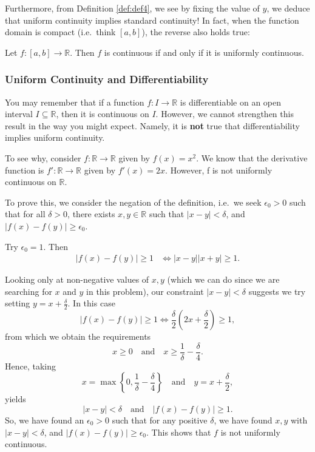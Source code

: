 \documentclass[
  10pt,
  a4paper]{article}
\theoremstyle{plain}
\theoremstyle{definition}
\theoremstyle{plain}
\theoremstyle{plain}
\theoremstyle{plain}
\theoremstyle{plain}
\theoremstyle{definition}
\theoremstyle{definition}
\theoremstyle{remark}
\theoremstyle{remark}
\let\BeginKnitrBlock\begin \let\EndKnitrBlock\end
\begin{document}
Furthermore, from Definition \ref{def:def4}, we see by fixing the value of \(y\), we deduce that uniform continuity implies standard continuity! In fact, when the function domain is compact (i.e.~think \([a,b]\)), the reverse also holds true:

\BeginKnitrBlock{proposition}
{\label{prp:prop2} }Let \(f:[a,b] \to \mathbb{R}\). Then \(f\) is continuous if and only if it is uniformly continuous.
\EndKnitrBlock{proposition}

\hypertarget{uniform-continuity-and-differentiability}{%
\subsubsection{Uniform Continuity and Differentiability}\label{uniform-continuity-and-differentiability}}

You may remember that if a function \(f:I \to \mathbb{R}\) is differentiable on an open interval \(I \subseteq \mathbb{R}\), then it is continuous on \(I\). However, we cannot strengthen this result in the way you might expect. Namely, it is \textbf{not} true that differentiability implies uniform continuity.

\BeginKnitrBlock{example}
{\label{exm:ex1} }To see why, consider \(f:\mathbb{R} \to \mathbb{R}\) given by \(f(x) = x^2\). We know that the derivative function is \(f':\mathbb{R} \to \mathbb{R}\) given by \(f'(x) = 2x.\) However, f is not uniformly continuous on \(\mathbb{R}\).

To prove this, we consider the negation of the definition, i.e.~we seek \(\epsilon_0 >0\) such that for all \(\delta > 0\), there exists \(x,y \in \mathbb{R}\) such that \(\lvert x - y \rvert < \delta\), and \(\lvert f(x) - f(y) \rvert \geq \epsilon_0.\)

Try \(\epsilon_0 = 1.\) Then
\begin{align*}
\lvert f(x) - f(y) \rvert \geq 1 &\Leftrightarrow \lvert x - y \rvert \lvert x + y \rvert \geq 1.
\end{align*}

Looking only at non-negative values of \(x,y\) (which we can do since we are searching for \(x\) and \(y\) in this problem), our constraint \(\lvert x - y \rvert < \delta\) suggests we try setting \(y = x + \frac{\delta}{2}.\) In this case \[\lvert f(x) - f(y) \rvert \geq 1 \Leftrightarrow \frac{\delta}{2}\left(2x + \frac{\delta}{2}\right) \geq 1,\] from which we obtain the requirements \[x \geq 0 \quad \text{and} \quad x \geq \frac{1}{\delta} - \frac{\delta}{4}.\] Hence, taking \[x = \max\left\lbrace 0 , \frac{1}{\delta} - \frac{\delta}{4}\right\rbrace \quad \text{and} \quad y = x + \frac{\delta}{2},\] yields \[\lvert x - y \rvert < \delta \quad \text{and} \quad \lvert f(x) - f(y) \rvert \geq 1.\] So, we have found an \(\epsilon_0>0\) such that for any positive \(\delta\), we have found \(x,y\) with \(\lvert x - y \rvert < \delta\), and \(\lvert f(x) - f(y) \rvert \geq \epsilon_0.\) This shows that \(f\) is not uniformly continuous.
\EndKnitrBlock{example}
\end{document}
